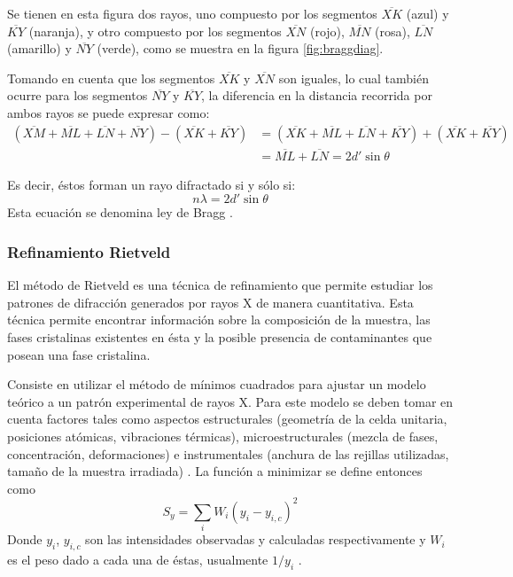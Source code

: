 \documentclass[../main.tex]{subfiles}
\begin{document}
Se tienen en esta figura dos rayos, uno compuesto por los segmentos $\overline{XK}$ (azul) y $\overline{KY}$ (naranja), y otro compuesto por los segmentos $\overline{XN}$ (rojo), $\overline{MN}$ (rosa), $\overline{LN}$ (amarillo) y $\overline{NY}$ (verde), como se muestra en la figura \ref{fig:braggdiag}.

Tomando en cuenta que los segmentos $\overline{XK}$ y $\overline{XN}$ son iguales, lo cual también ocurre para los segmentos $\overline{NY}$ y $\overline{KY}$, la diferencia en la distancia recorrida por ambos rayos se puede expresar como:
\begin{equation}
    \begin{split}
        (\overline{XM}+\overline{ML}+\overline{LN}+\overline{NY})-(\overline{XK}+\overline{KY})&=(\overline{XK}+\overline{ML}+\overline{LN}+\overline{KY})+(\overline{XK}+\overline{KY})\\
        &=\overline{ML}+\overline{LN}=2d'\sin{\theta}
    \end{split}
    \label{eq:rayosbragg}
\end{equation}

Es decir, éstos forman un rayo difractado si y sólo si:
\begin{equation}
    n\lambda=2d'\sin{\theta}
    \label{eq:leydebragg}
\end{equation}
Esta ecuación se denomina ley de Bragg \cite{Cullity2014}.
\subsubsection{Refinamiento Rietveld}
El método de Rietveld es una técnica de refinamiento que permite estudiar los patrones de difracción generados por rayos X de manera cuantitativa. Esta técnica permite encontrar información sobre la composición de la muestra, las fases cristalinas existentes en ésta y la posible presencia de contaminantes que posean una fase cristalina.

Consiste en utilizar el método de mínimos cuadrados para ajustar un modelo teórico a un patrón experimental de rayos X. Para este modelo se deben tomar en cuenta factores tales como aspectos estructurales (geometría de la celda unitaria, posiciones atómicas, vibraciones térmicas), microestructurales (mezcla de fases, concentración, deformaciones) e instrumentales (anchura de las rejillas utilizadas, tamaño de la muestra irradiada) \cite{Rietveld}. La función a minimizar se define entonces como
\begin{equation}
    S_y=\sum_i W_i\left(y_{i}-y_{i,c}\right)^2
    \label{eq:minimcuad}
\end{equation}
Donde $y_{i}$, $y_{i,c}$ son las intensidades observadas y calculadas respectivamente y $W_i$ es el peso dado a cada una de éstas, usualmente $1/y_i$ \cite{Fuentes2004}.
\end{document}

